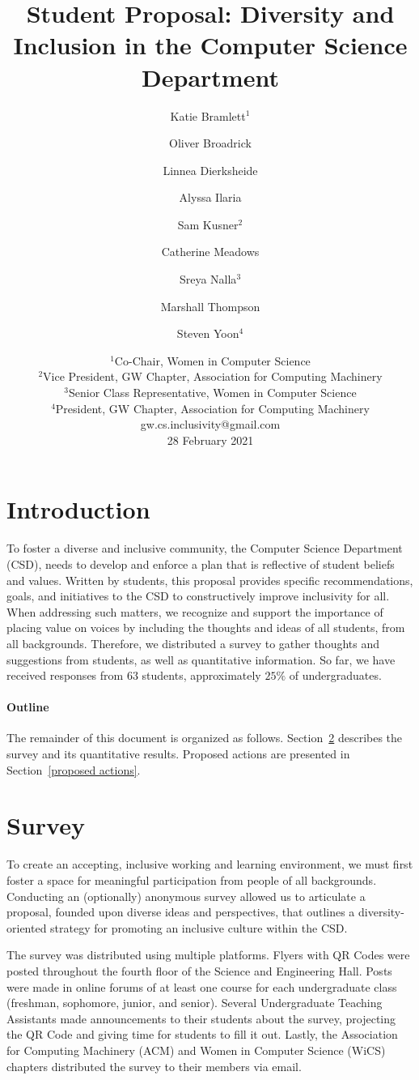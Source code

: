 \documentclass{article}
\title{Student Proposal: Diversity and Inclusion in the Computer Science Department}
\author{
Katie Bramlett$^1$\and
Oliver Broadrick\and
Linnea Dierksheide\and
Alyssa Ilaria\and
Sam Kusner$^2$\and
Catherine Meadows\and
Sreya Nalla$^3$\and
Marshall Thompson\and
Steven Yoon$^4$
}
\date{%
    $^1$Co-Chair, Women in Computer Science\\
    $^2$Vice President, GW Chapter, Association for Computing Machinery\\
    $^3$Senior Class Representative, Women in Computer Science\\
    $^4$President, GW Chapter, Association for Computing Machinery\\
    gw.cs.inclusivity@gmail.com\\
    28 February 2021
}
\begin{document}
\maketitle


\section{Introduction}
To foster a diverse and inclusive community, the Computer Science Department (CSD), 
needs to develop and enforce a plan that is reflective of student beliefs and values.
Written by students, this proposal
provides specific recommendations, goals, and initiatives
to the CSD to constructively improve
inclusivity for all.
When addressing such matters, we recognize and support the importance of 
placing value on voices by including the thoughts and ideas of all students, from all backgrounds.
Therefore, we distributed a survey to gather thoughts and suggestions from students, as well as 
quantitative information. So far, we have
received responses from $63$ students, approximately $25\%$ of undergraduates.

\paragraph{Outline}
The remainder of this document is organized as follows.
Section~\ref{survey} describes the survey and its quantitative results.
Proposed actions are presented in Section~\ref{proposed actions}.

\section{Survey}\label{survey}
To create an accepting, inclusive working and learning environment, we must 
first foster a space for meaningful participation from people of all backgrounds.
Conducting an (optionally) anonymous survey allowed us to articulate a proposal, 
founded upon diverse ideas and perspectives, that outlines a diversity-oriented
strategy for promoting an inclusive culture within the CSD.

The survey was distributed using multiple platforms. Flyers with QR Codes were posted
throughout the fourth floor of the Science and Engineering Hall.
Posts were made in online forums of at least one course
for each undergraduate class (freshman, sophomore, junior, and senior).
Several Undergraduate Teaching Assistants made announcements to their 
students about the survey, projecting the QR Code and giving time
for students to fill it out. Lastly, the Association for Computing Machinery (ACM) and Women 
in Computer Science (WiCS) chapters distributed the survey to their members via email. 
\end{document}
